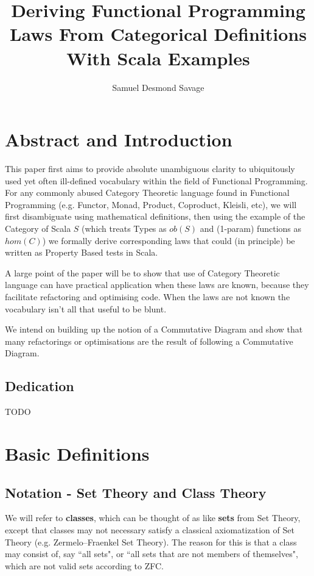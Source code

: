 \documentclass[9pt]{article} %
\title{\bf{Deriving Functional Programming Laws From Categorical Definitions With Scala Examples}}
\author{Samuel Desmond Savage}
\begin{document}
\maketitle
\tableofcontents

\newpage 

\section{Abstract and Introduction}

This paper first aims to provide absolute unambiguous clarity to ubiquitously used yet often ill-defined vocabulary within the field of Functional Programming.  For any commonly abused Category Theoretic language found in Functional Programming (e.g. Functor, Monad, Product, Coproduct, Kleisli, etc), we will first disambiguate using mathematical definitions, then using the example of the Category of Scala $S$ (which treats Types as $ob(S)$ and (1-param) functions as $hom(C)$) we formally derive corresponding laws that could (in principle) be written as Property Based tests in Scala.

A large point of the paper will be to show that use of Category Theoretic language can have practical application when these laws are known, because they facilitate refactoring and optimising code. When the laws are not known the vocabulary isn't all that useful to be blunt.

We intend on building up the notion of a Commutative Diagram and show that many refactorings or optimisations are the result of following a Commutative Diagram.

\subsection{Dedication}

TODO

\section{Basic Definitions}

\subsection{Notation - Set Theory and Class Theory}

We will refer to \textbf{classes}, which can be thought of as like \textbf{sets} from Set Theory, except that classes may not necessary satisfy a classical axiomatization of Set Theory (e.g. Zermelo–Fraenkel Set Theory).  The reason for this is that a class may consist of, say ``all sets", or ``all sets that are not members of themselves", which are not valid sets according to ZFC.
\end{document}
